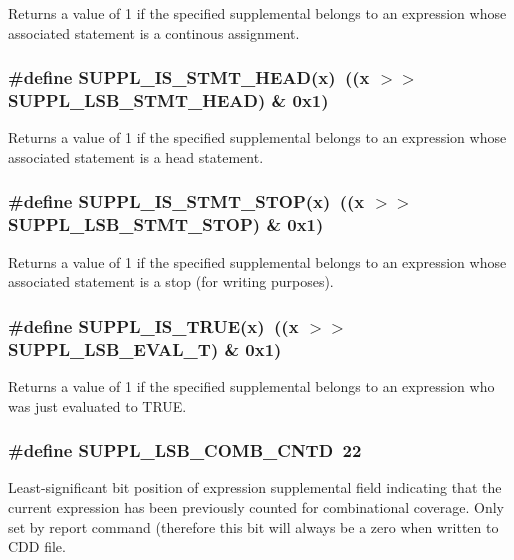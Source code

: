 Returns a value of 1 if the specified supplemental belongs to an expression whose associated statement is a continous assignment. 
\subsubsection{\setlength{\rightskip}{0pt plus 5cm}\#define SUPPL\_\-IS\_\-STMT\_\-HEAD(x)\ ((x $>$$>$ SUPPL\_\-LSB\_\-STMT\_\-HEAD) \& 0x1)}\label{group__expr__suppl_a24}


Returns a value of 1 if the specified supplemental belongs to an expression whose associated statement is a head statement. 
\subsubsection{\setlength{\rightskip}{0pt plus 5cm}\#define SUPPL\_\-IS\_\-STMT\_\-STOP(x)\ ((x $>$$>$ SUPPL\_\-LSB\_\-STMT\_\-STOP) \& 0x1)}\label{group__expr__suppl_a25}


Returns a value of 1 if the specified supplemental belongs to an expression whose associated statement is a stop (for writing purposes). 
\subsubsection{\setlength{\rightskip}{0pt plus 5cm}\#define SUPPL\_\-IS\_\-TRUE(x)\ ((x $>$$>$ SUPPL\_\-LSB\_\-EVAL\_\-T) \& 0x1)}\label{group__expr__suppl_a27}


Returns a value of 1 if the specified supplemental belongs to an expression who was just evaluated to TRUE. 
\subsubsection{\setlength{\rightskip}{0pt plus 5cm}\#define SUPPL\_\-LSB\_\-COMB\_\-CNTD\ 22}\label{group__expr__suppl_a17}


Least-significant bit position of expression supplemental field indicating that the current expression has been previously counted for combinational coverage. Only set by report command (therefore this bit will always be a zero when written to CDD file. 
